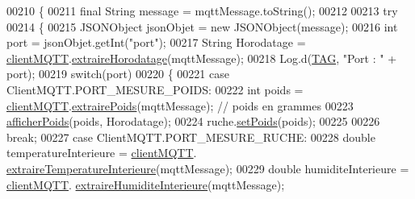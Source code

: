 \begin{DoxyCode}
00210     \{
00211         \textcolor{keyword}{final} String message = mqttMessage.toString();
00212 
00213         \textcolor{keywordflow}{try}
00214         \{
00215             JSONObject jsonObjet = \textcolor{keyword}{new} JSONObject(message);
00216             \textcolor{keywordtype}{int} port = jsonObjet.getInt(\textcolor{stringliteral}{"port"});
00217             String Horodatage = \hyperlink{classfr_1_1campus_1_1laurainc_1_1honeybee_1_1_dashboard_activity_ac72bac3feefe69341b1785a0133e1de8}{clientMQTT}.\hyperlink{classfr_1_1campus_1_1laurainc_1_1honeybee_1_1_client_m_q_t_t_ace17d633909a5be8035518b9a6b528c2}{extraireHorodatage}(mqttMessage);
00218             Log.d(\hyperlink{classfr_1_1campus_1_1laurainc_1_1honeybee_1_1_dashboard_activity_a716b8b0ff7279634ec5d3079ddf5d840}{TAG}, \textcolor{stringliteral}{"Port : "} + port);
00219             \textcolor{keywordflow}{switch}(port)
00220             \{
00221                 \textcolor{keywordflow}{case} ClientMQTT.PORT\_MESURE\_POIDS:
00222                     \textcolor{keywordtype}{int} poids = \hyperlink{classfr_1_1campus_1_1laurainc_1_1honeybee_1_1_dashboard_activity_ac72bac3feefe69341b1785a0133e1de8}{clientMQTT}.\hyperlink{classfr_1_1campus_1_1laurainc_1_1honeybee_1_1_client_m_q_t_t_a390da1e77f256fd9d90093bfec544b55}{extrairePoids}(mqttMessage); \textcolor{comment}{// poids en
       grammes}
00223                     \hyperlink{classfr_1_1campus_1_1laurainc_1_1honeybee_1_1_dashboard_activity_a13786896440cb102e03bd5ac4f54c3d8}{afficherPoids}(poids, Horodatage);
00224                     ruche.\hyperlink{classfr_1_1campus_1_1laurainc_1_1honeybee_1_1_ruche_a0d85ef1bc9f53591e6cf0cc8667fbe2d}{setPoids}(poids);
00225 
00226                     \textcolor{keywordflow}{break};
00227                 \textcolor{keywordflow}{case} ClientMQTT.PORT\_MESURE\_RUCHE:
00228                     \textcolor{keywordtype}{double} temperatureInterieure = \hyperlink{classfr_1_1campus_1_1laurainc_1_1honeybee_1_1_dashboard_activity_ac72bac3feefe69341b1785a0133e1de8}{clientMQTT}.
      \hyperlink{classfr_1_1campus_1_1laurainc_1_1honeybee_1_1_client_m_q_t_t_a92cd25872cdb04978a55ae166f858e0d}{extraireTemperatureInterieure}(mqttMessage);
00229                     \textcolor{keywordtype}{double} humiditeInterieure = \hyperlink{classfr_1_1campus_1_1laurainc_1_1honeybee_1_1_dashboard_activity_ac72bac3feefe69341b1785a0133e1de8}{clientMQTT}.
      \hyperlink{classfr_1_1campus_1_1laurainc_1_1honeybee_1_1_client_m_q_t_t_ad7fd3fa1a51a608646b146765cfc4546}{extraireHumiditeInterieure}(mqttMessage);

\end{DoxyCode}
